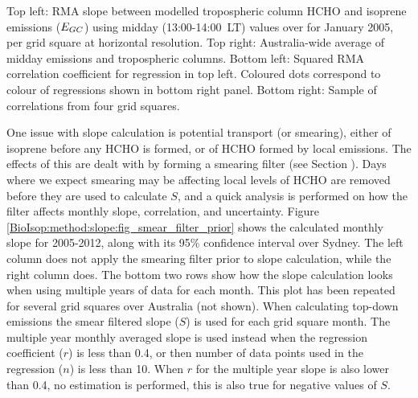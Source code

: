     { %
      Top left: RMA slope between modelled tropospheric column HCHO and isoprene emissions ($E_{GC}$) using midday (13:00-14:00~LT) values over for January 2005, per grid square at \lowhr horizontal resolution.
      Top right: Australia-wide average of midday emissions and tropospheric columns.
      Bottom left: Squared RMA correlation coefficient for regression in top left. Coloured dots correspond to colour of regressions shown in bottom right panel.
      Bottom right: Sample of correlations from four grid squares.
    }
    {\label{BioIsop:method:slope:fig_regressions}}
    
    One issue with slope calculation is potential transport (or smearing), either of isoprene before any HCHO is formed, or of HCHO formed by local emissions.
    The effects of this are dealt with by forming a smearing filter (see Section ).
    Days where we expect smearing may be affecting local levels of HCHO are removed before they are used to calculate $S$, and a quick analysis is performed on how the filter affects monthly slope, correlation, and uncertainty.
    Figure \ref{BioIsop:method:slope:fig_smear_filter_prior} shows the calculated monthly slope for 2005-2012, along with its 95\% confidence interval over Sydney.
    The left column does not apply the smearing filter prior to slope calculation, while the right column does.
    The bottom two rows show how the slope calculation looks when using multiple years of data for each month.
    This plot has been repeated for several grid squares over Australia (not shown).
    When calculating top-down emissions the smear filtered slope ($S$) is used for each grid square month.
    The multiple year monthly averaged slope is used instead when the regression coefficient ($r$) is less than 0.4, or then number of data points used in the regression ($n$) is less than 10.
    When $r$ for the multiple year slope is also lower than 0.4, no estimation is performed, this is also true for negative values of $S$.
    
    
